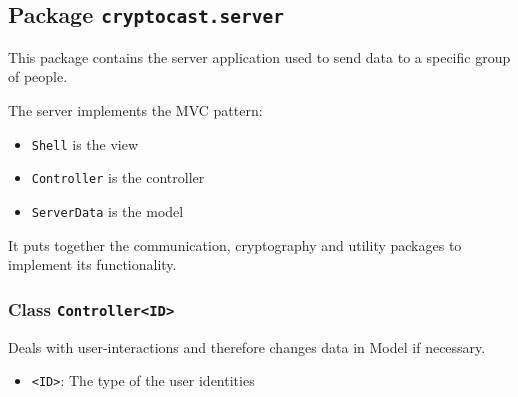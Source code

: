 \subsection{Package \lstinline!cryptocast.server!}
This package contains the server application used to send data to a specific group of people.

 The server implements the MVC pattern:
 \begin{itemize}
 \item \lstinline|Shell| is the view
 \item \lstinline|Controller| is the controller
 \item \lstinline|ServerData| is the model
 \end{itemize}

 It puts together the communication, cryptography and utility packages to implement its functionality.

\subsubsection{Class \lstinline|Controller<ID>|}
Deals with user-interactions and therefore changes data in Model if necessary. \\
\noindent\begin{minipage}[t]{5cm}
\vspace{0.3em}
\hspace*{2em}
\vspace{0.3em}
\end{minipage}

\begin{itemize}
\item \lstinline|<ID>|: The type of the user identities
\end{itemize}



